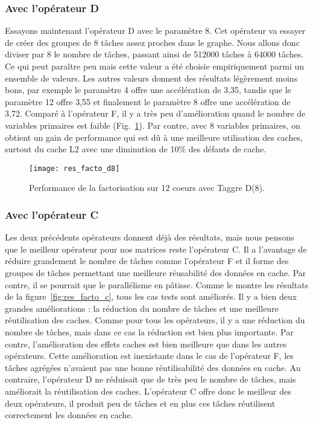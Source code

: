 \subsubsection{Avec l'opérateur D}
Essayons maintenant l'opérateur D avec le paramètre 8.
%
Cet opérateur va essayer de créer des groupes de 8 tâches assez proches dans le graphe.
%
Nous allons donc diviser par 8 le nombre de tâches, passant ainsi de 512000 tâches à 64000 tâches.
%
Ce qui peut paraître peu mais cette valeur a été choisie empiriquement parmi un ensemble de valeurs.
%
Les autres valeurs donnent des résultats légèrement moins bons, par exemple le paramètre 4 offre une accélération de 3,35, tandis que le paramètre 12 offre 3,55 et finalement le paramètre 8 offre une accélération de 3,72.
%
Comparé à l'opérateur F, il y a très peu d'amélioration quand le nombre de variables primaires est faible (Fig.~\ref{fig:res_facto_d8}).
%
Par contre, avec 8 variables primaires, on obtient un gain de performance qui est dû à une meilleure utilisation des caches, surtout du cache L2 avec une diminution de 10\% des défauts de cache.
\begin{figure}[!h]
  \centering
  \texttt{[image: res\_facto\_d8]}
  \caption{Performance de la factorisation sur 12 coeurs avec Taggre D(8).}
  \label{fig:res_facto_d8}
\end{figure}


\subsubsection{Avec l'opérateur C}
Les deux précédents opérateurs donnent déjà des résultats, mais nous pensons que le meilleur opérateur pour nos matrices reste l'opérateur C.
%
Il a l'avantage de réduire grandement le nombre de tâches comme l'opérateur F et il forme des groupes de tâches permettant une meilleure réusabilité des données en cache.
%
Par contre, il se pourrait que le parallélisme en pâtisse.
%
Comme le montre les résultats de la figure~\ref{fig:res_facto_c}, tous les cas tests sont améliorés.
%
Il y a bien deux grandes améliorations : la réduction du nombre de tâches et une meilleure réutilisation des caches.
%
Comme pour tous les opérateurs, il y a une réduction du nombre de tâches, mais dans ce cas la réduction est bien plus importante.
%
Par contre, l'amélioration des effets caches est bien meilleure que dans les autres opérateurs.
%
Cette amélioration est inexistante dans le cas de l'opérateur F, les tâches agrégées n'avaient pas une bonne réutilisabilité des données en cache.
%
Au contraire, l'opérateur D ne réduisait que de très peu le nombre de tâches, mais améliorait la réutilisation des caches.
%
L'opérateur C offre donc le meilleur des deux opérateurs, il produit peu de tâches et en plus ces tâches réutilisent correctement les données en cache.

